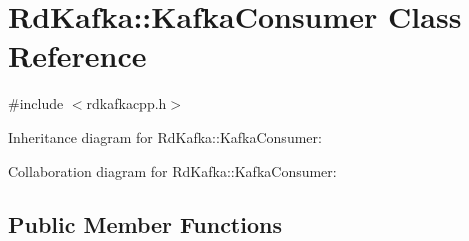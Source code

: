 \hypertarget{classRdKafka_1_1KafkaConsumer}{\section{Rd\-Kafka\-:\-:Kafka\-Consumer Class Reference}
\label{classRdKafka_1_1KafkaConsumer}
}


{\ttfamily \#include $<$rdkafkacpp.\-h$>$}



Inheritance diagram for Rd\-Kafka\-:\-:Kafka\-Consumer\-:


Collaboration diagram for Rd\-Kafka\-:\-:Kafka\-Consumer\-:
\subsection*{Public Member Functions}

